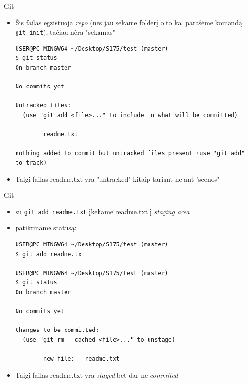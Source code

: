 \documentclass[11pt,xcolor=table]{beamer}
\begin{document}
\begin{frame}[fragile]{Git}
\begin{itemize}
\item Šis failas egzistuoja \textit{repo} (nes jau sekame folderį o to kai parašėme komandą \colorbox{listinggray}{\lstinline|git init|}), tačiau nėra "sekamas"
\begin{lstlisting}
USER@PC MINGW64 ~/Desktop/S175/test (master)
$ git status
On branch master

No commits yet

Untracked files:
  (use "git add <file>..." to include in what will be committed)

        readme.txt

nothing added to commit but untracked files present (use "git add" to track)

\end{lstlisting}
\item Taigi failas readme.txt yra "untracked" kitaip tariant ne ant "scenos"
\end{itemize}
\end{frame}


\begin{frame}[fragile]{Git}
\begin{itemize}
\item su \colorbox{listinggray}{\lstinline|git add readme.txt|} įkeliame readme.txt į \textit{staging area}
\item patikriname statusą:
\begin{lstlisting}
USER@PC MINGW64 ~/Desktop/S175/test (master)
$ git add readme.txt

USER@PC MINGW64 ~/Desktop/S175/test (master)
$ git status
On branch master

No commits yet

Changes to be committed:
  (use "git rm --cached <file>..." to unstage)

        new file:   readme.txt
\end{lstlisting}
\item Taigi failas readme.txt yra \textit{staged} bet dar ne \textit{commited}
\end{itemize}
\end{frame}

\end{document}

